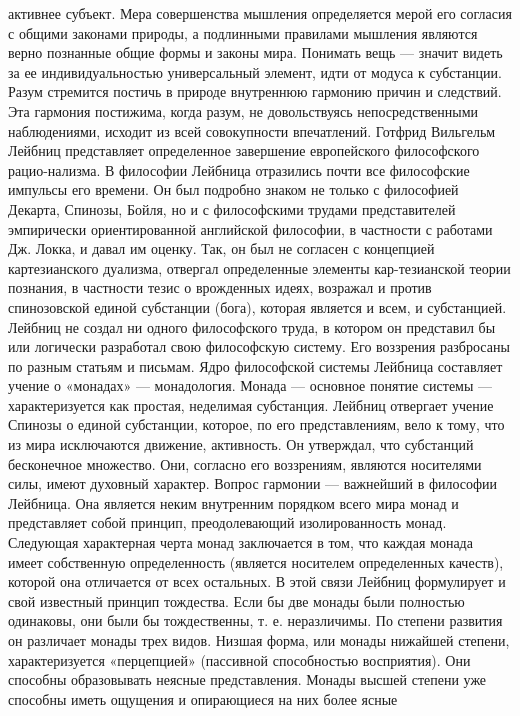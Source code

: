 \documentclass[12pt]{article}
\begin{document}
активнее субъект. Мера совершенства мышления определяется мерой его согласия с общими законами природы,
а подлинными правилами мышления являются верно познанные общие формы и законы мира. Понимать вещь
—  значит  видеть  за  ее  индивидуальностью  универсальный  элемент,  идти  от  модуса  к  субстанции.  Разум
стремится постичь в природе внутреннюю гармонию причин и следствий. Эта гармония постижима, когда
разум, не довольствуясь непосредственными наблюдениями, исходит из всей совокупности впечатлений.
Готфрид  Вильгельм  Лейбниц  представляет  определенное  завершение  европейского  философского  рацио-нализма. В философии Лейбница отразились почти все философские импульсы его времени. Он был подробно
знаком  не только с  философией Декарта,  Спинозы,  Бойля, но  и с  философскими трудами представителей
эмпирически ориентированной английской философии, в частности с работами Дж. Локка, и давал им оценку.
Так,  он  был  не  согласен  с  концепцией  картезианского  дуализма,  отвергал  определенные  элементы  кар-тезианской теории познания, в частности тезис о врожденных идеях, возражал и против спинозовской единой
субстанции (бога), которая является и всем, и субстанцией.
Лейбниц не создал ни одного философского труда, в котором он представил бы или логически разработал свою
философскую систему. Его воззрения разбросаны по разным статьям и письмам.
Ядро философской системы Лейбница составляет учение о «монадах» — монадология. Монада — основное
понятие системы — характеризуется как простая, неделимая субстанция. Лейбниц отвергает учение Спинозы о
единой  субстанции,  которое,  по  его  представлениям,  вело  к  тому,  что  из  мира  исключаются  движение,
активность. Он утверждал, что субстанций бесконечное множество. Они, согласно его воззрениям, являются
носителями силы, имеют духовный характер.
Вопрос гармонии — важнейший в философии Лейбница. Она является неким внутренним порядком всего мира
монад и представляет собой принцип, преодолевающий изолированность монад.
Следующая характерная черта монад заключается в том, что каждая монада имеет собственную определенность
(является носителем определенных качеств), которой она отличается от всех остальных. В этой связи Лейбниц
формулирует и свой известный принцип тождества. Если бы две монады были полностью одинаковы, они были
бы тождественны, т. е. неразличимы.
По  степени  развития  он  различает  монады  трех  видов.  Низшая  форма,  или  монады  нижайшей  степени,
характеризуется «перцепцией» (пассивной способностью восприятия). Они способны образовывать неясные
представления. Монады высшей степени уже способны иметь ощущения и опирающиеся на них более ясные
\end{document}
